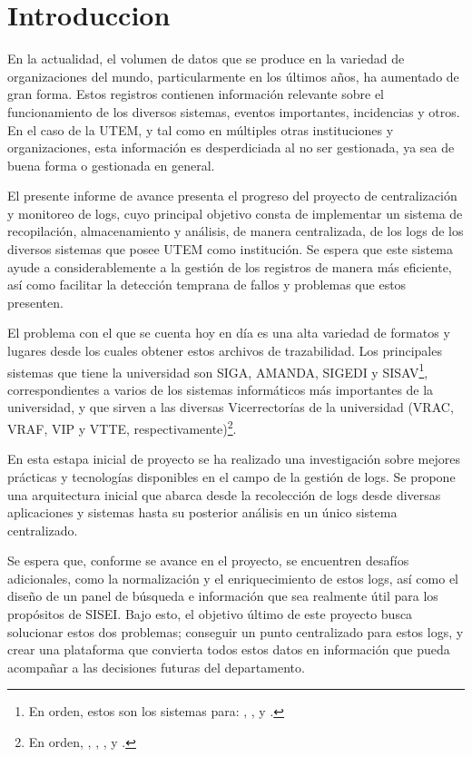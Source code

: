 \section{Introduccion}

En la actualidad, el volumen de datos que se produce en la variedad de organizaciones del mundo, particularmente en los últimos años, ha aumentado de gran forma. Estos registros contienen información relevante sobre el funcionamiento de los diversos sistemas, eventos importantes, incidencias y otros. En el caso de la UTEM, y tal como en múltiples otras instituciones y organizaciones, esta información es desperdiciada al no ser gestionada, ya sea de buena forma o gestionada en general.

El presente informe de avance presenta el progreso del proyecto de centralización y monitoreo de logs, cuyo principal objetivo consta de implementar un sistema de recopilación, almacenamiento y análisis, de manera centralizada, de los logs de los diversos sistemas que posee UTEM como institución. Se espera que este sistema ayude a considerablemente a la gestión de los registros de manera más eficiente, así como facilitar la detección temprana de fallos y problemas que estos presenten.

El problema con el que se cuenta hoy en día es una alta variedad de formatos y lugares desde los cuales obtener estos archivos de trazabilidad. Los principales sistemas que tiene la universidad son SIGA, AMANDA, SIGEDI y SISAV\footnote{En orden, estos son los sistemas para: , ,  y .}, correspondientes a varios de los sistemas informáticos más importantes de la universidad, y que sirven a las diversas Vicerrectorías de la universidad (VRAC, VRAF, VIP y VTTE, respectivamente)\footnote{En orden, , , , y .}.

En esta estapa inicial de proyecto se ha realizado una investigación sobre mejores prácticas y tecnologías disponibles en el campo de la gestión de logs. Se propone una arquitectura inicial que abarca desde la recolección de logs desde diversas aplicaciones y sistemas hasta su posterior análisis en un único sistema centralizado.

Se espera que, conforme se avance en el proyecto, se encuentren desafíos adicionales, como la normalización y el enriquecimiento de estos logs, así como el diseño de un panel de búsqueda e información que sea realmente útil para los propósitos de SISEI. Bajo esto, el objetivo último de este proyecto busca solucionar estos dos problemas; conseguir un punto centralizado para estos logs, y crear una plataforma que convierta todos estos datos en información que pueda acompañar a las decisiones futuras del departamento.

